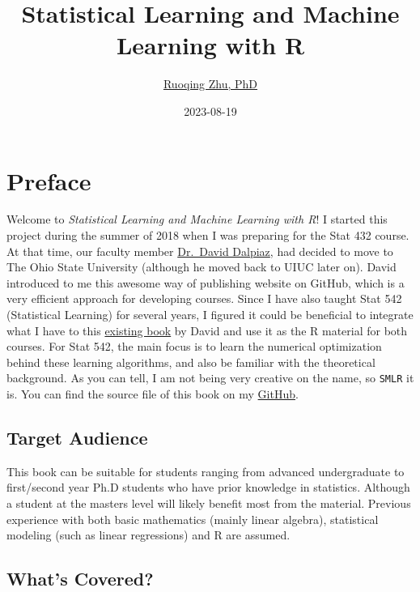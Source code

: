 \documentclass[
]{book}
\title{Statistical Learning and Machine Learning with R}
\author{\href{https://sites.google.com/site/teazrq/}{Ruoqing Zhu, PhD}}
\date{2023-08-19}
\theoremstyle{definition}
\theoremstyle{definition}
\theoremstyle{definition}
\theoremstyle{definition}
\theoremstyle{remark}
\begin{document}
\maketitle

{
\hypersetup{linkcolor=}
\setcounter{tocdepth}{1}
\tableofcontents
}
\hypertarget{preface}{%
\chapter*{Preface}\label{preface}}

Welcome to \emph{Statistical Learning and Machine Learning with R}! I started this project during the summer of 2018 when I was preparing for the Stat 432 course. At that time, our faculty member \href{https://daviddalpiaz.com/teaching.html}{Dr.~David Dalpiaz}, had decided to move to The Ohio State University (although he moved back to UIUC later on). David introduced to me this awesome way of publishing website on GitHub, which is a very efficient approach for developing courses. Since I have also taught Stat 542 (Statistical Learning) for several years, I figured it could be beneficial to integrate what I have to this \href{https://daviddalpiaz.github.io/r4sl/}{existing book} by David and use it as the R material for both courses. For Stat 542, the main focus is to learn the numerical optimization behind these learning algorithms, and also be familiar with the theoretical background. As you can tell, I am not being very creative on the name, so \texttt{SMLR} it is. You can find the source file of this book on my \href{https://teazrq.github.io/SMLR/}{GitHub}.

\hypertarget{target-audience}{%
\section*{Target Audience}\label{target-audience}}

This book can be suitable for students ranging from advanced undergraduate to first/second year Ph.D students who have prior knowledge in statistics. Although a student at the masters level will likely benefit most from the material. Previous experience with both basic mathematics (mainly linear algebra), statistical modeling (such as linear regressions) and R are assumed.

\hypertarget{whats-covered}{%
\section*{What's Covered?}\label{whats-covered}}
\end{document}
